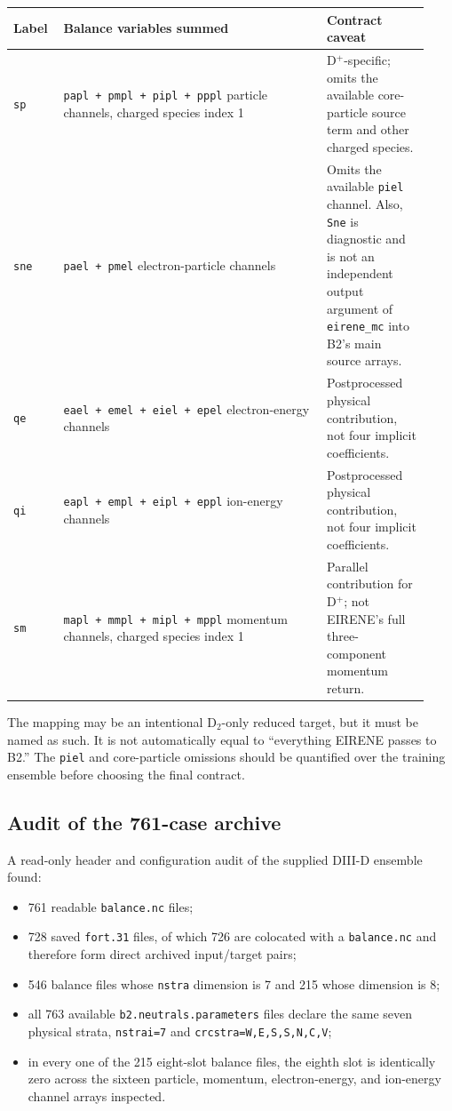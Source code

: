 \documentclass[11pt]{article}
\begin{document}
\begin{longtable}{@{}p{0.11\linewidth}p{0.59\linewidth}p{0.23\linewidth}@{}}
\toprule
Label & Balance variables summed & Contract caveat \\
\midrule
\endhead
\texttt{sp} & \texttt{papl + pmpl + pipl + pppl} particle channels, charged species index 1 & D$^+$-specific; omits the available core-particle source term and other charged species. \\
\texttt{sne} & \texttt{pael + pmel} electron-particle channels & Omits the available \texttt{piel} channel. Also, \texttt{Sne} is diagnostic and is not an independent output argument of \texttt{eirene\_mc} into B2's main source arrays. \\
\texttt{qe} & \texttt{eael + emel + eiel + epel} electron-energy channels & Postprocessed physical contribution, not four implicit coefficients. \\
\texttt{qi} & \texttt{eapl + empl + eipl + eppl} ion-energy channels & Postprocessed physical contribution, not four implicit coefficients. \\
\texttt{sm} & \texttt{mapl + mmpl + mipl + mppl} momentum channels, charged species index 1 & Parallel contribution for D$^+$; not EIRENE's full three-component momentum return. \\
\bottomrule
\end{longtable}

The mapping may be an intentional D$_2$-only reduced target, but it must be named as such. It is not automatically equal to ``everything EIRENE passes to B2.'' The \texttt{piel} and core-particle omissions should be quantified over the training ensemble before choosing the final contract.

\subsection{Audit of the 761-case archive}

A read-only header and configuration audit of the supplied DIII-D ensemble found:

\begin{itemize}
\item 761 readable \texttt{balance.nc} files;
\item 728 saved \texttt{fort.31} files, of which 726 are colocated with a \texttt{balance.nc} and therefore form direct archived input/target pairs;
\item 546 balance files whose \texttt{nstra} dimension is 7 and 215 whose dimension is 8;
\item all 763 available \texttt{b2.neutrals.parameters} files declare the same seven physical strata, \texttt{nstrai=7} and \texttt{crcstra=W,E,S,S,N,C,V};
\item in every one of the 215 eight-slot balance files, the eighth slot is identically zero across the sixteen particle, momentum, electron-energy, and ion-energy channel arrays inspected.
\end{itemize}
\end{document}
